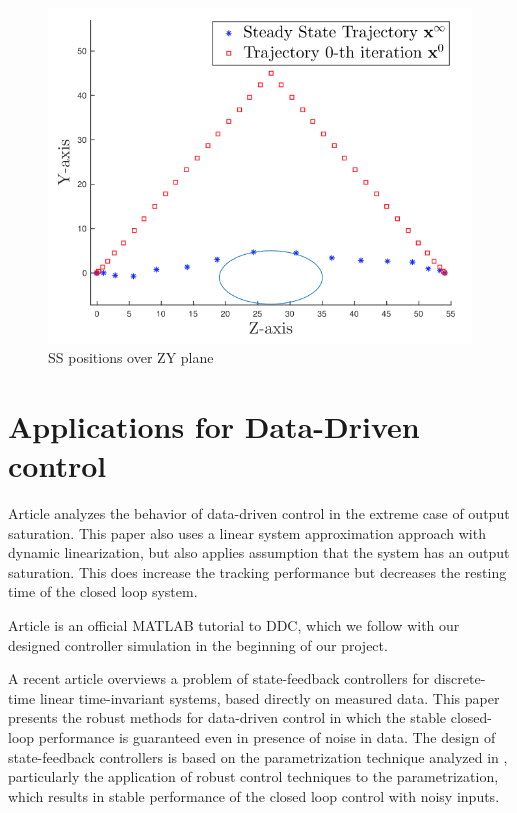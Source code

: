 \documentclass[]{final_report}
\begin{document}
\begin{figure} [h!]
\centerline{\includegraphics[width=.75\textwidth]{Screenshots for related work/Asset p2/Asset p2p1.png}}
\caption{SS positions over ZY plane
\cite{rosolia2018a}}
\label{fig:p2p1}
\end{figure}

\section{Applications for Data-Driven control }

Article \cite{bu2018a} analyzes the behavior of data-driven control in the extreme case of output saturation. This paper also uses a linear system approximation approach with dynamic linearization, but also applies assumption that the system has an output saturation. This does increase the tracking performance but decreases the resting time of the closed loop system. 

Article \cite{pravallika2021a} is an official MATLAB tutorial to DDC, which we follow with our designed controller simulation in the beginning of our project.

A recent article \cite{Berberich_2020} overviews a problem of state-feedback controllers for discrete-time linear time-invariant systems, based directly on measured data. This paper presents the robust methods for data-driven control in which the stable closed-loop performance is guaranteed even in presence of noise in data. The design of state-feedback controllers is based on the parametrization technique analyzed in \cite{de2019a}, particularly the application of robust control techniques to the parametrization, which results in stable performance of the closed loop control with noisy inputs.
\end{document}
